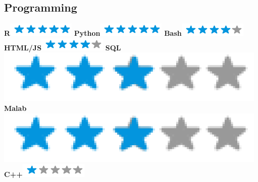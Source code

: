\documentclass[]{friggeri-cv}
\begin{document}
\begin{aside}
  \section{Programming}
    \textbf{R}\includegraphics[scale=0.40]{img/5stars.png}
    \textbf{Python}\includegraphics[scale=0.40]{img/5stars.png}
    \textbf{Bash}\includegraphics[scale=0.40]{img/4stars.png}
    \textbf{HTML/JS}\includegraphics[scale=0.40]{img/4stars.png}
    \textbf{SQL}\includegraphics[scale=0.40]{img/3stars.png}
    \textbf{Malab}\includegraphics[scale=0.40]{img/3stars.png}
     \textbf{C++}\includegraphics[scale=0.40]{img/1stars.png}
    ~

\end{aside}
\end{document}

